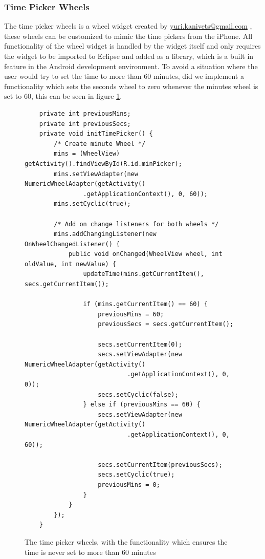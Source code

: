 \subsubsection*{Time Picker Wheels}
The time picker wheels is a wheel widget created by \url{yuri.kanivets@gmail.com} \cite{web:android:customize:wheel}, these wheels can be customized to mimic the time pickers from the iPhone.
All functionality of the wheel widget is handled by the widget itself and only requires the widget to be imported to Eclipse and added as a library, which is a built in feature in the Android development environment.
To avoid a situation where the user would try to set the time to more than 60 minutes, did we implement a functionality which sets the seconds wheel to zero whenever the minutes wheel is set to 60, this can be seen in figure \ref{code:customize:time_picker_wheels}.

\begin{figure}[H]
\begin{verbatim}
	private int previousMins;
	private int previousSecs;
	private void initTimePicker() {
		/* Create minute Wheel */
		mins = (WheelView) getActivity().findViewById(R.id.minPicker);
		mins.setViewAdapter(new NumericWheelAdapter(getActivity()
				.getApplicationContext(), 0, 60));
		mins.setCyclic(true);

		/* Add on change listeners for both wheels */
		mins.addChangingListener(new OnWheelChangedListener() {
			public void onChanged(WheelView wheel, int oldValue, int newValue) {
				updateTime(mins.getCurrentItem(), secs.getCurrentItem());

				if (mins.getCurrentItem() == 60) {
					previousMins = 60;
					previousSecs = secs.getCurrentItem();

					secs.setCurrentItem(0);
					secs.setViewAdapter(new NumericWheelAdapter(getActivity()
							.getApplicationContext(), 0, 0));
					secs.setCyclic(false);
				} else if (previousMins == 60) {
					secs.setViewAdapter(new NumericWheelAdapter(getActivity()
							.getApplicationContext(), 0, 60));

					secs.setCurrentItem(previousSecs);
					secs.setCyclic(true);
					previousMins = 0;
				}
			}
		});
	}
\end{verbatim}
\caption{The time picker wheels, with the functionality which ensures the time is never set to more than 60 minutes}%
\label{code:customize:time_picker_wheels}%
\end{figure}


